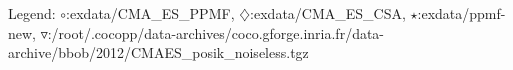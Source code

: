 Legend: {\color{NavyBlue}$\circ$}:exdata/CMA\_ES\_PPMF, {\color{Magenta}$\diamondsuit$}:exdata/CMA\_ES\_CSA, {\color{Orange}$\star$}:exdata/ppmf-new, {\color{CornflowerBlue}$\triangledown$}:/root/.cocopp/data-archives/coco.gforge.inria.fr/data-archive/bbob/2012/CMAES\_posik\_noiseless.tgz